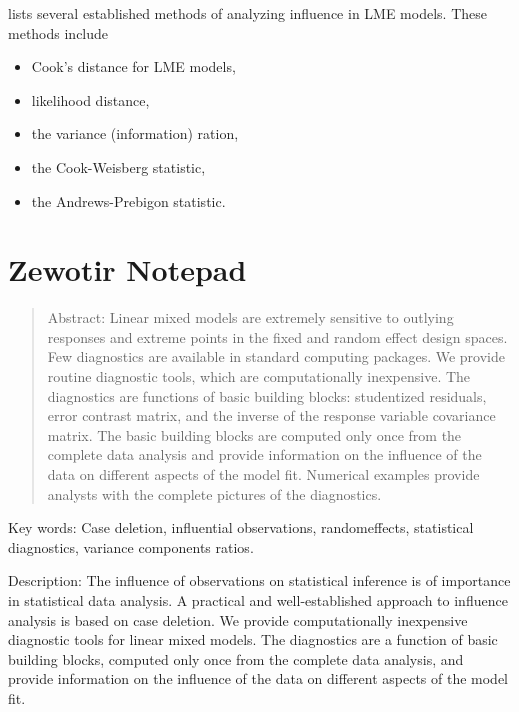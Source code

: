 \documentclass[12pt, a4paper]{article}
\begin{document}
\citet{Zewotir} lists several established methods of analyzing influence in LME models. These methods include \begin{itemize}
	\item Cook's distance for LME models,
	\item {} likelihood distance,
	\item the variance (information) ration,
	\item the  Cook-Weisberg statistic,
	\item the  Andrews-Prebigon statistic.
\end{itemize}



\section{Zewotir Notepad}

\begin{quote}
	Abstract: Linear mixed models are extremely sensitive to outlying responses and extreme points in the fixed and random effect design spaces. Few diagnostics are available in standard computing packages. We provide routine diagnostic tools, which are computationally inexpensive. The diagnostics
	are functions of basic building blocks: studentized residuals, error contrast matrix, and the inverse of the response variable covariance matrix. The basic building blocks are computed only once from the complete data analysis and provide information on the influence of the data on different aspects
	of the model fit. Numerical examples provide analysts with the complete pictures of the diagnostics.
\end{quote}
Key words: Case deletion, influential observations, randomeffects, statistical
diagnostics, variance components ratios.


Description: The influence of observations on statistical inference is of importance in statistical data analysis. 
A practical and well-established approach to influence analysis is based on case deletion. 
We provide computationally inexpensive diagnostic tools for linear mixed models. 
The diagnostics are a function of basic building blocks, computed only once from the complete data analysis, 
and provide information on the influence of the data on different aspects of the model fit.
\end{document}
